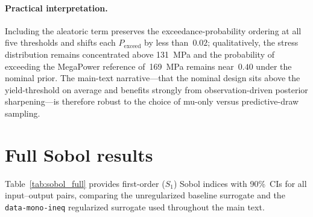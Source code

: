 \documentclass[pdflatex,sn-mathphys-num]{sn-jnl}
\theoremstyle{thmstyleone}
\theoremstyle{thmstyletwo}
\theoremstyle{thmstylethree}
\begin{document}
\begin{appendices}
\paragraph{Practical interpretation.}
Including the aleatoric term preserves the exceedance-probability ordering at
all five thresholds and shifts each $P_{\mathrm{exceed}}$ by less than~$0.02$;
qualitatively, the stress distribution remains concentrated above \SI{131}{MPa}
and the probability of exceeding the MegaPower reference of~\SI{169}{MPa}
remains near~$0.40$ under the nominal prior.
The main-text narrative---that the nominal design sits above the
yield-threshold on average and benefits strongly from observation-driven
posterior sharpening---is therefore robust to the choice of mu-only versus
predictive-draw sampling.

\section{Full Sobol results}\label{sec:appendix_sobol}

Table~\ref{tab:sobol_full} provides first-order ($S_{1}$) Sobol indices with 90\%~CIs
for all input--output pairs, comparing the unregularized baseline surrogate and the
\texttt{data-mono-ineq} regularized surrogate used throughout the main text.


\end{appendices}
\end{document}
